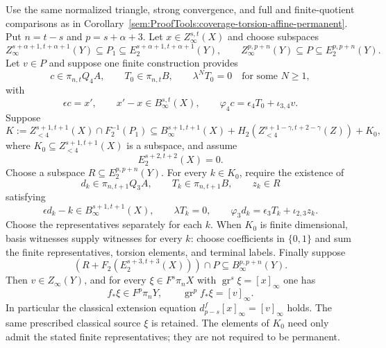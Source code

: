 \begin{proposition}
\label{sem:ProofTools:coverage-torsion-residual}
Use the same normalized triangle, strong convergence, and full
and finite-quotient comparisons as in
Corollary~\ref{sem:ProofTools:coverage-torsion-affine-permanent}.
Put $n=t-s$ and $p=s+\alpha+3$.
Let $x\in Z_\infty^{s,t}(X)$ and choose subspaces
\[
 Z_\infty^{s+\alpha+1,t+\alpha+1}(Y)\subseteq P_1
 \subseteq E_2^{s+\alpha+1,t+\alpha+1}(Y),\qquad
 Z_\infty^{p,p+n}(Y)\subseteq P\subseteq E_2^{p,p+n}(Y).
\]
Let $v\in P$ and suppose one finite construction provides
\[
 c\in\pi_{n,t}Q_4A,\qquad T_0\in\pi_{n,t}B,\qquad
 \lambda^NT_0=0\quad\text{for some }N\geq1,
\]
with
\[
 \epsilon c=x',\qquad x'-x\in B_\infty^{s,t}(X),\qquad
 \varphi_4c=\epsilon_4T_0+\iota_{3,4}v.
\]
Suppose
\[
 K:=Z_{<4}^{s+1,t+1}(X)\cap F_2^{-1}(P_1)
 \subseteq B_\infty^{s+1,t+1}(X)
 +H_2\!\left(Z_{<4}^{s+1-\gamma,t+2-\gamma}(Z)\right)+K_0,
\]
where $K_0\subseteq Z_{<4}^{s+1,t+1}(X)$ is a subspace, and assume
\[
 E_2^{s+2,t+2}(X)=0.
\]
Choose a subspace $R\subseteq E_2^{p,p+n}(Y)$. For every $k\in K_0$,
require the existence of
\[
 d_k\in\pi_{n,t+1}Q_3A,\qquad
 T_k\in\pi_{n,t+1}B,\qquad z_k\in R
\]
satisfying
\[
 \epsilon d_k-k\in B_\infty^{s+1,t+1}(X),\qquad\lambda T_k=0,\qquad
 \varphi_3d_k=\epsilon_3T_k+\iota_{2,3}z_k.
\]
Choose the representatives separately for each $k$. When $K_0$ is finite
dimensional, basis witnesses supply witnesses for every $k$: choose
coefficients in $\{0,1\}$ and sum the finite representatives, torsion
elements, and terminal labels. Finally suppose
\[
 \left(R+F_2\!\left(E_2^{s+3,t+3}(X)\right)\right)\cap P
 \subseteq B_\infty^{p,p+n}(Y).
\]
Then $v\in Z_\infty(Y)$, and for every
$\xi\in F^s\pi_nX$ with $\operatorname{gr}^s\xi=[x]_\infty$ one has
\[
 f_*\xi\in F^p\pi_nY,\qquad
 \operatorname{gr}^p f_*\xi=[v]_\infty.
\]
In particular the classical extension equation
$d^f_{p-s}[x]_\infty=[v]_\infty$ holds. The same prescribed classical
source $\xi$ is retained. The elements of $K_0$ need only admit the stated
finite representatives; they are not required to be permanent.
\end{proposition}
